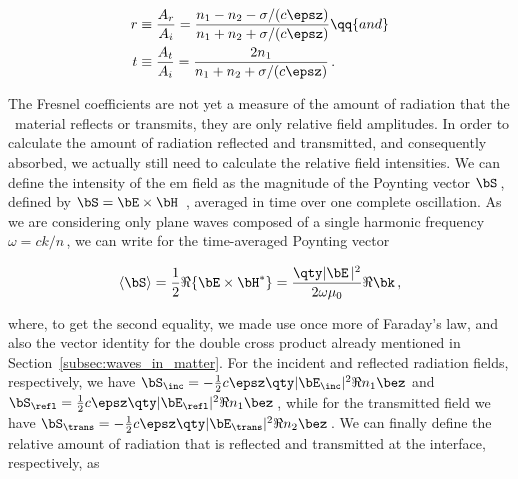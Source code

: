 \begin{subequations}
    \begin{align}
        r &\equiv \frac{A_r}{A_i} = \frac{n_1 - n_2 - \sigma/(c \epsz)}{n_1 + n_2 + \sigma/(c \epsz)} \qq{and} \label{subeq:Fresnel_reflection_coefficient} \\
        t &\equiv \frac{A_t}{A_i} = \frac{2 n_1}{n_1 + n_2 + \sigma/(c \epsz)}\,. \label{subeq:Fresnel_transmission_coefficient}
    \end{align}
\end{subequations}

\begin{figure}[ht]
    \centering
    
    \label{fig:normal_incidence}
\end{figure}

The Fresnel coefficients are not yet a measure of the amount of radiation that the \bd~material reflects or transmits, they are only relative field amplitudes.
In order to calculate the amount of radiation reflected and transmitted, and consequently absorbed, we actually still need to calculate the relative field intensities.
We can define the intensity of the \gls{em} field as the magnitude of the Poynting vector $\bS$\,, defined by $\bS = \bE \times \bH$~\cite{Jackson:electrodynamics,Hohenester_2020}, averaged in time over one complete oscillation.
As we are considering only plane waves composed of a single harmonic frequency $\omega = c k /n$\,, we can write for the time-averaged Poynting vector~\cite{Hohenester_2020}

\begin{equation}
    \langle \bS \rangle = \frac{1}{2} \Re\{\bE \times \bH^*\} = \frac{\qty|\bE\,|^2}{2 \omega \mu_0} \Re{\bk}\,,
\end{equation}

\noindent where, to get the second equality, we made use once more of Faraday's law, and also the vector identity for the double cross product already mentioned in Section~\ref{subsec:waves_in_matter}.
For the incident and reflected radiation fields, respectively, we have $\bS_\inc = -\frac{1}{2} c \epsz \qty|\bE_\inc|^2  \Re{n_1} \bez$ and $\bS_\refl =\frac{1}{2} c \epsz \qty|\bE_\refl|^2 \Re{n_1}\bez$\,, while for the transmitted field we have $\bS_\trans = - \frac{1}{2} c \epsz \qty|\bE_\trans|^2 \Re{n_2} \bez$\,.
We can finally define the relative amount of radiation that is reflected and transmitted at the interface, respectively, as

